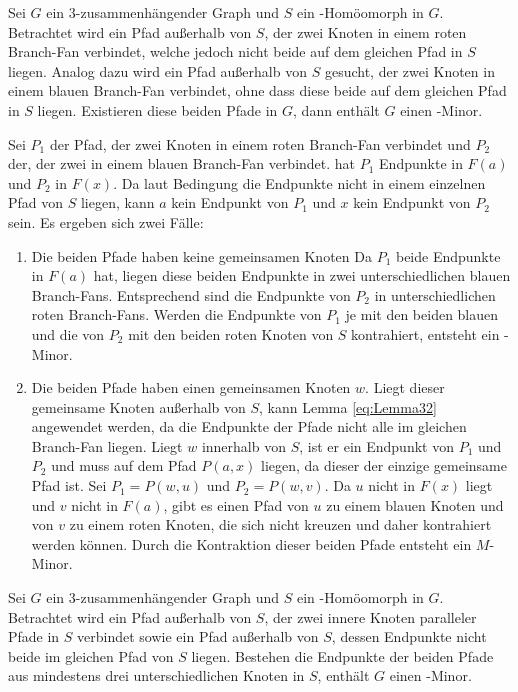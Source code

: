 \begin{lemma}\label{eq:Lemma33}
  Sei $G$ ein $3$-zusammenhängender Graph und $S$ ein \kdd-Homöomorph in $G$.
  Betrachtet wird ein Pfad außerhalb von $S$, der zwei Knoten in einem roten Branch-Fan verbindet, welche jedoch nicht beide auf dem gleichen Pfad in $S$ liegen.
  Analog dazu wird ein Pfad außerhalb von $S$ gesucht, der zwei Knoten in einem blauen Branch-Fan verbindet, ohne dass diese beide auf dem gleichen Pfad in $S$ liegen.
  Existieren diese beiden Pfade in $G$, dann enthält $G$ einen \kf-Minor.
\end{lemma}
\begin{beweis}
  Sei $P_1$ der Pfad, der zwei Knoten in einem roten Branch-Fan verbindet und $P_2$ der, der zwei in einem blauen Branch-Fan verbindet.
  \OBdA hat $P_1$ Endpunkte in $F(a)$ und $P_2$ in $F(x)$.
  Da laut Bedingung die Endpunkte nicht in einem einzelnen Pfad von $S$ liegen, kann $a$ kein Endpunkt von $P_1$ und $x$ kein Endpunkt von $P_2$ sein.
  Es ergeben sich zwei Fälle:
  \begin{enumerate}
    \item Die beiden Pfade haben keine gemeinsamen Knoten
          Da $P_1$ beide Endpunkte in $F(a)$ hat, liegen diese beiden Endpunkte in zwei unterschiedlichen blauen Branch-Fans.
          Entsprechend sind die Endpunkte von $P_2$ in unterschiedlichen roten Branch-Fans.
          Werden die Endpunkte von $P_1$ je mit den beiden blauen und die von $P_2$ mit den beiden roten Knoten von $S$ kontrahiert, entsteht ein \kf-Minor. %
    \item Die beiden Pfade haben einen gemeinsamen Knoten $w$.
          Liegt dieser gemeinsame Knoten außerhalb von $S$, kann Lemma \ref{eq:Lemma32} angewendet werden, da die Endpunkte der Pfade nicht alle im gleichen Branch-Fan liegen.
          Liegt $w$ innerhalb von $S$, ist er ein Endpunkt von $P_1$ und $P_2$ und muss auf dem Pfad $P(a, x)$ liegen, da dieser der einzige gemeinsame Pfad ist.
          Sei $P_1 = P(w, u)$ und $P_2 = P(w, v)$.
          Da $u$ nicht in $F(x)$ liegt und $v$ nicht in $F(a)$, gibt es einen Pfad von $u$ zu einem blauen Knoten und von $v$ zu einem roten Knoten, die sich nicht kreuzen und daher kontrahiert werden können.
          Durch die Kontraktion dieser beiden Pfade entsteht ein $M$-Minor. %
  \end{enumerate}
\end{beweis}

\begin{lemma}\label{eq:Lemma34}
  Sei $G$ ein $3$-zusammenhängender Graph und $S$ ein \kdd-Homöomorph in $G$.
  Betrachtet wird ein Pfad außerhalb von $S$, der zwei innere Knoten paralleler Pfade in $S$ verbindet sowie ein Pfad außerhalb von $S$, dessen Endpunkte nicht beide im gleichen Pfad von $S$ liegen.
  Bestehen die Endpunkte der beiden Pfade aus mindestens drei unterschiedlichen Knoten in $S$, enthält $G$ einen \kf-Minor.
\end{lemma}

